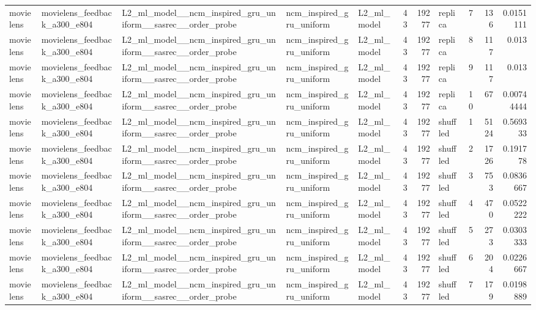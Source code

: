 \begin{table}[htbp!]
\begin{tabular}{lllllrrlrrr}
movielens & movielens\_feedback\_a300\_e804 & L2\_ml\_model\_\_ncm\_inspired\_gru\_uniform\_\_sasrec\_\_order\_probe & ncm\_inspired\_gru\_uniform & L2\_ml\_model & 43 & 19277 & replica & 7 & 136 & 0.0151111 \\
movielens & movielens\_feedback\_a300\_e804 & L2\_ml\_model\_\_ncm\_inspired\_gru\_uniform\_\_sasrec\_\_order\_probe & ncm\_inspired\_gru\_uniform & L2\_ml\_model & 43 & 19277 & replica & 8 & 117 & 0.013 \\
movielens & movielens\_feedback\_a300\_e804 & L2\_ml\_model\_\_ncm\_inspired\_gru\_uniform\_\_sasrec\_\_order\_probe & ncm\_inspired\_gru\_uniform & L2\_ml\_model & 43 & 19277 & replica & 9 & 117 & 0.013 \\
movielens & movielens\_feedback\_a300\_e804 & L2\_ml\_model\_\_ncm\_inspired\_gru\_uniform\_\_sasrec\_\_order\_probe & ncm\_inspired\_gru\_uniform & L2\_ml\_model & 43 & 19277 & replica & 10 & 67 & 0.00744444 \\
movielens & movielens\_feedback\_a300\_e804 & L2\_ml\_model\_\_ncm\_inspired\_gru\_uniform\_\_sasrec\_\_order\_probe & ncm\_inspired\_gru\_uniform & L2\_ml\_model & 43 & 19277 & shuffled & 1 & 5124 & 0.569333 \\
movielens & movielens\_feedback\_a300\_e804 & L2\_ml\_model\_\_ncm\_inspired\_gru\_uniform\_\_sasrec\_\_order\_probe & ncm\_inspired\_gru\_uniform & L2\_ml\_model & 43 & 19277 & shuffled & 2 & 1726 & 0.191778 \\
movielens & movielens\_feedback\_a300\_e804 & L2\_ml\_model\_\_ncm\_inspired\_gru\_uniform\_\_sasrec\_\_order\_probe & ncm\_inspired\_gru\_uniform & L2\_ml\_model & 43 & 19277 & shuffled & 3 & 753 & 0.0836667 \\
movielens & movielens\_feedback\_a300\_e804 & L2\_ml\_model\_\_ncm\_inspired\_gru\_uniform\_\_sasrec\_\_order\_probe & ncm\_inspired\_gru\_uniform & L2\_ml\_model & 43 & 19277 & shuffled & 4 & 470 & 0.0522222 \\
movielens & movielens\_feedback\_a300\_e804 & L2\_ml\_model\_\_ncm\_inspired\_gru\_uniform\_\_sasrec\_\_order\_probe & ncm\_inspired\_gru\_uniform & L2\_ml\_model & 43 & 19277 & shuffled & 5 & 273 & 0.0303333 \\
movielens & movielens\_feedback\_a300\_e804 & L2\_ml\_model\_\_ncm\_inspired\_gru\_uniform\_\_sasrec\_\_order\_probe & ncm\_inspired\_gru\_uniform & L2\_ml\_model & 43 & 19277 & shuffled & 6 & 204 & 0.0226667 \\
movielens & movielens\_feedback\_a300\_e804 & L2\_ml\_model\_\_ncm\_inspired\_gru\_uniform\_\_sasrec\_\_order\_probe & ncm\_inspired\_gru\_uniform & L2\_ml\_model & 43 & 19277 & shuffled & 7 & 179 & 0.0198889 \\

\end{tabular}
\end{table}
